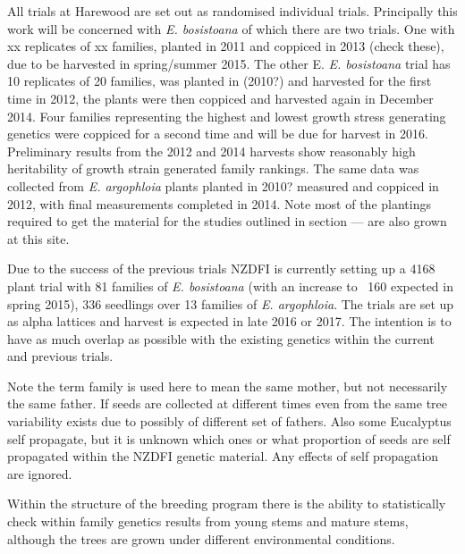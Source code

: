 \documentclass{article}
\begin{document}
All trials at Harewood are set out as randomised individual trials. Principally
this work will be concerned with \textit{E. bosistoana} of which there  are two
trials.
One with xx replicates of xx families, planted in 2011 and coppiced in 2013
(check these), due to be harvested in spring/summer 2015. The other E.
\textit{E. bosistoana} trial has 10 replicates of 20 families, was planted in (2010?) and
harvested for the first time in 2012, the plants were then coppiced and
harvested again in December 2014. Four families representing the highest and
lowest growth stress generating genetics were coppiced for a second time and
will be due for harvest in 2016. Preliminary results from the 2012 and 2014
harvests show reasonably high heritability of growth strain generated family
rankings. The same data was collected from \textit{E. argophloia} plants planted in 2010?
measured and coppiced in 2012, with final measurements completed in 2014. Note
most of the plantings required to get the material for the studies outlined in
section --- are also grown at this site.

Due to the success of the previous trials NZDFI is currently setting up a 4168
plant trial with 81 families of \textit{E. bosistoana} (with an increase to ~160
expected in spring 2015), 336 seedlings over 13 families of \textit{E.
argophloia}. The trials are set up as alpha lattices and harvest is expected in
late 2016 or 2017. The intention is to have as much overlap as possible with the
existing genetics within the current and previous trials.

Note the term family is used here to mean the same mother, but not necessarily
the same father. If seeds are collected at different times even from the same
tree variability exists due to possibly of different set of fathers. Also some
Eucalyptus self propagate, but it is unknown which ones or what proportion of
seeds are self propagated within the NZDFI genetic material. Any effects of self
propagation are ignored.

Within the structure of the breeding program there is the ability to
statistically check within family genetics results from young stems and mature
stems, although the trees are grown under different environmental conditions.
\end{document}
